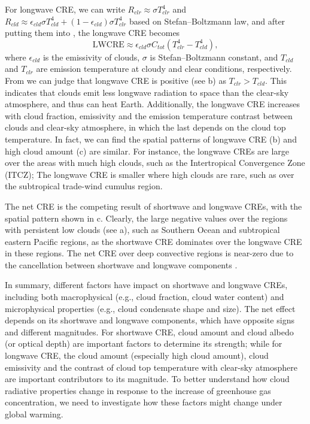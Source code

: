 For longwave CRE, we can write $R_{clr}\approx \sigma T_{clr}^4$ and $R_{cld}\approx \epsilon_{cld}\sigma T_{cld}^4 +  (1-\epsilon_{cld}) \sigma T_{clr}^4$ based on Stefan--Boltzmann law, and after putting them into , the longwave CRE becomes
\begin{equation}
    \mathrm{LWCRE} \approx \epsilon_{cld} \sigma C_{tot}\left(T_{clr}^4-T_{cld}^4\right),
    \label{eq:lwcre2}
\end{equation}
where $\epsilon_{cld}$ is the emissivity of clouds, $\sigma$ is Stefan--Boltzmann constant, and $T_{cld}$ and $T_{clr}$ are emission temperature at cloudy and clear conditions, respectively. From  we can judge that longwave CRE is positive  (see b) as $T_{clr}>T_{cld}$. This indicates that clouds emit less longwave radiation to space than the clear-sky atmosphere, and thus can heat Earth. Additionally, the longwave CRE increases with cloud fraction, emissivity and the emission temperature contrast between clouds and clear-sky atmosphere, in which the last depends on the cloud top temperature. In fact, we can find the spatial patterns of longwave CRE (b) and high cloud amount (c) are similar. For instance, the longwave CREs are large over the areas with much high clouds, such as the Intertropical Convergence Zone (ITCZ); The longwave CRE is smaller where high clouds are rare, such as over the subtropical trade-wind cumulus region.

The net CRE is the competing result of shortwave and longwave CREs, with the spatial pattern shown in c. Clearly, the large negative values over the regions with persistent low clouds (see a), such as Southern Ocean and subtropical eastern Pacific regions, as the shortwave CRE dominates over the longwave CRE in these regions. The net CRE over deep convective regions is near-zero due to the cancellation between shortwave and longwave components \citep[e.g.,][]{Wall2019net}.

In summary, different factors have impact on shortwave and longwave CREs, including both macrophysical (e.g., cloud fraction, cloud water content) and microphysical properties (e.g., cloud condensate shape and size). The net effect depends on its shortwave and longwave components, which have opposite signs and different magnitudes. For shortwave CRE, cloud amount and cloud albedo (or optical depth) are important factors to determine its strength; while for longwave CRE, the cloud amount (especially high cloud amount), cloud emissivity and the contrast of cloud top temperature with clear-sky atmosphere are important contributors to its magnitude. To better understand how cloud radiative properties change in response to the increase of greenhouse gas concentration, we need to investigate how these factors might change under global warming.

